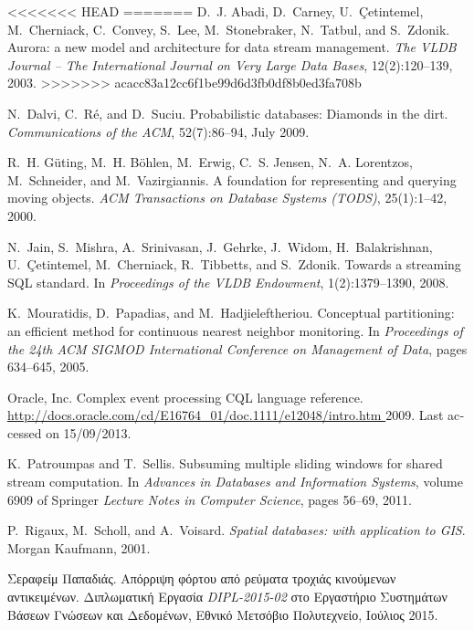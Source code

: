 \begin{thebibliography}{1}
<<<<<<< HEAD
=======
\bibitem{[ACC+03]} {\textlatin{
D.~J. Abadi, D.~Carney, U.~{\c{C}}etintemel, M.~Cherniack, C.~Convey, S.~Lee,  M.~Stonebraker, N.~Tatbul, and S.~Zdonik. 
Aurora: a new model and architecture for data stream management.
{\em The VLDB Journal -- The International Journal on Very Large Data Bases}, 12(2):120--139, 2003}}.
>>>>>>> acacc83a12cc6f1be99d6d3fb0df8b0ed3fa708b

\bibitem{[DRS09]} {\textlatin{
N.~Dalvi, C.~R{\'e}, and D.~Suciu. Probabilistic databases: Diamonds in the dirt. {\em Communications of the ACM}, 52(7):86--94, July 2009}}.

\bibitem{[GBE+00]} {\textlatin{
R.~H. G{\"u}ting, M.~H. B{\"o}hlen, M.~Erwig, C.~S. Jensen, N.~A. Lorentzos,
  M.~Schneider, and M.~Vazirgiannis.
A foundation for representing and querying moving objects.
{\em ACM Transactions on Database Systems (TODS)}, 25(1):1--42, 2000}}.

\bibitem{[JMS+08]} {\textlatin{
N.~Jain, S.~Mishra, A.~Srinivasan, J.~Gehrke, J.~Widom, H.~Balakrishnan,
  U.~{\c{C}}etintemel, M.~Cherniack, R.~Tibbetts, and S.~Zdonik.
Towards a streaming {SQL} standard.
In {\em Proceedings of the VLDB Endowment}, 1(2):1379--1390, 2008}}.

\bibitem{[MHP05]} {\textlatin{
K.~Mouratidis, D.~Papadias, and M.~Hadjieleftheriou. 
Conceptual partitioning: an efficient method for continuous nearest
  neighbor monitoring.
In {\em Proceedings of the 24th ACM SIGMOD International
  Conference on Management of Data}, pages 634--645, 2005}}.

\bibitem{[Ora11]} {\textlatin{
{Oracle, Inc}.
Complex event processing {CQL} language reference.
\url{http://docs.oracle.com/cd/E16764_01/doc.1111/e12048/intro.htm }
  2009. Last accessed on 15/09/2013}}.
  

\bibitem{[PS11]} {\textlatin{
K.~Patroumpas and T.~Sellis.
Subsuming multiple sliding windows for shared stream computation.
In {\em Advances in
  Databases and Information Systems}, volume 6909 of Springer {\em Lecture Notes in
  Computer Science}, pages 56--69, 2011}}.

\bibitem{[RSV02]} {\textlatin{
P.~Rigaux, M.~Scholl, and A.~Voisard.
{\em Spatial databases: with application to {GIS}}.
Morgan Kaufmann, 2001}}.

\bibitem{[Pap15]}
Σεραφείμ Παπαδιάς.
Απόρριψη φόρτου από ρεύματα
  τροχιάς κινούμενων αντικειμένων. Διπλωματική Εργασία {\textlatin{\em DIPL-2015-02}} στο
Εργαστήριο Συστημάτων Βάσεων Γνώσεων και Δεδομένων, Εθνικό Μετσόβιο
  Πολυτεχνείο, Ιούλιος 2015.

\end{thebibliography}